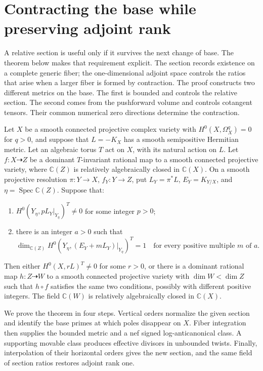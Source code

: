 \section{Contracting the base while preserving adjoint rank}
\label{g:cf:contraction}

A relative section is useful only if it survives the next change of base.
The theorem below makes that requirement explicit. The section records
existence on a complete generic fiber; the one-dimensional adjoint space
controls the ratios that arise when a larger fiber is formed by contraction.
The proof constructs two different metrics on the base. The first is
bounded and controls the relative section. The second comes from the
pushforward volume and controls cotangent tensors. Their common numerical
zero directions determine the contraction.

\begin{theorem}\label{g:cf:contraction-theorem}
Let $X$ be a smooth connected projective complex variety with
$H^0(X,\Omega_X^q)=0$ for $q>0$, and suppose that $L=-K_X$ has a smooth
semipositive Hermitian metric. Let an algebraic torus $T$ act on $X$,
with its natural action on $L$. Let $f:X\dashrightarrow Z$ be a dominant
$T$-invariant rational map to a smooth connected projective variety,
where $\mathbb C(Z)$ is relatively algebraically closed in $\mathbb C(X)$.
On a smooth projective resolution $\pi:Y\to X$, $f_Y:Y\to Z$, put
$L_Y=\pi^*L$, $E_Y=K_{Y/X}$, and
$\eta=\operatorname{Spec}\mathbb C(Z)$. Suppose that:
\begin{enumerate}
\item $H^0(Y_\eta,pL_Y|_{Y_\eta})^T\ne0$ for some integer $p>0$;
\item there is an integer $a>0$ such that
\[
\dim_{\mathbb C(Z)}H^0(Y_\eta,(E_Y+mL_Y)|_{Y_\eta})^T=1
\quad\text{for every positive multiple }m\text{ of }a.
\]
\end{enumerate}
Then either $H^0(X,rL)^T\ne0$ for some $r>0$, or there is a dominant
rational map $h:Z\dashrightarrow W$ to a smooth connected projective
variety with $\dim W<\dim Z$ such that $h\circ f$ satisfies the same two
conditions, possibly with different positive integers. The field
$\mathbb C(W)$ is relatively algebraically closed in $\mathbb C(X)$.
\end{theorem}

We prove the theorem in four steps. Vertical orders normalize the given
section and identify the base primes at which poles disappear on $X$.
Fiber integration then supplies the bounded metric and a nef signed
log-anticanonical class. A supporting movable class produces effective
divisors in unbounded twists. Finally, interpolation of their horizontal
orders gives the new section, and the same field of section ratios restores
adjoint rank one.

